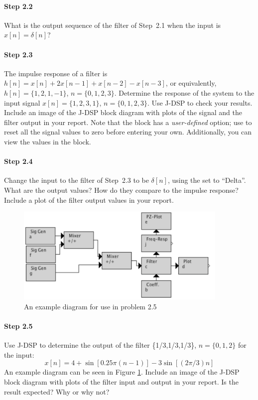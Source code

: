 \paragraph{Step 2.2} What is the output sequence of the filter of
	Step~2.1 when the input is $x[n] = \delta[n]$?


\paragraph{Step 2.3} The impulse response of a filter is $h[n] = x[n]
	+ 2x[n-1] + x[n-2] - x[n-3]$, or equivalently, $h[n]=\{1,2,1,-1\}$,
	$n=\{0, 1, 2, 3\}$. Determine the response of the system to the input
	signal $x[n]=\{1,2,3,1\}$, $n=\{0, 1,2,3\}$. Use J-DSP to check your
	results. Include an image of the J-DSP block diagram with plots of the
	 signal and the filter output in your report.  Note
	that the  block has a \emph{user-defined}
	 option; use  to reset all the signal
	values to zero before entering your own. Additionally, you can view
	the values in the  block.


\paragraph{Step 2.4} Change the input to the filter of Step~2.3 to be
	$\delta[n]$, using the  set to ``Delta''. What are the
	output values? How do they compare to the impulse response? Include a
	plot of the filter output values in your report.


\begin{figure}[t] 
   \centering
   	\includegraphics[width=4in]{lab6/threeinputproblem} 
   \caption{An example diagram for use in problem 2.5}
   \label{fg:threeinput}
\end{figure}
	
\paragraph{Step 2.5} Use J-DSP to determine the output of the filter \{1/3,1/3,1/3\}, $n=\{0,1,2\}$ for the
	input:
	\begin{equation}
	  x[n] = 4 + \sin[0.25\pi(n-1)] - 3 \sin[(2\pi/3)n]  
	\end{equation}
	An example diagram can be seen in Figure \ref{fg:threeinput}. Include an image 
	of the J-DSP block diagram with plots of the filter
	input and output in your report. Is the result expected? Why or why
	not?
	
